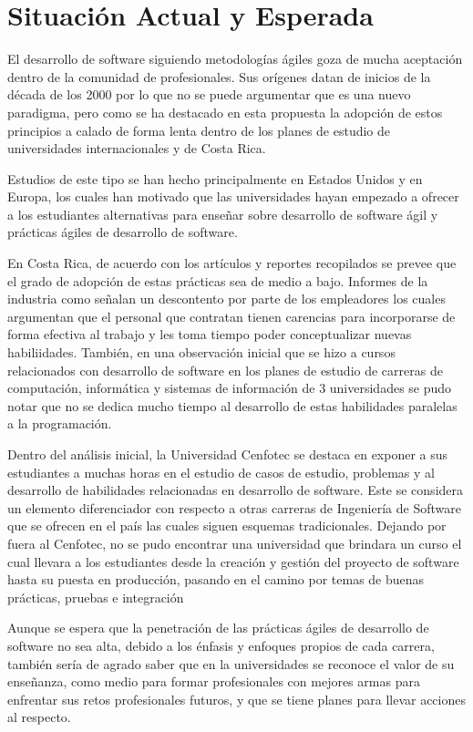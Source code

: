 \section{Situación Actual y Esperada}
El desarrollo de software siguiendo metodologías ágiles goza de mucha aceptación dentro de la comunidad de profesionales. Sus orígenes datan de inicios de la década de los 2000 por lo que no se puede argumentar que es una nuevo paradigma, pero como se ha destacado en esta propuesta la adopción  de estos principios a calado de forma lenta dentro de los planes de estudio de universidades internacionales y de Costa Rica.

Estudios de este tipo se han hecho principalmente en Estados Unidos y en Europa, los cuales han motivado que las universidades hayan empezado a ofrecer a los estudiantes alternativas para enseñar sobre desarrollo de software ágil y prácticas ágiles de desarrollo de software.

En Costa Rica, de acuerdo con los artículos y reportes recopilados se prevee que el grado de adopción de estas prácticas sea de medio a bajo. Informes de la industria como \cite{prosic, murillo-trejos} señalan un descontento por parte de los empleadores los cuales argumentan que el personal que contratan tienen carencias para incorporarse de forma efectiva al trabajo y les toma tiempo poder conceptualizar nuevas habiliidades. También, en una observación inicial que se hizo a cursos relacionados con desarrollo de software en los planes de estudio de carreras de computación, informática y sistemas de información de 3 universidades se pudo notar que no se dedica mucho tiempo al desarrollo de estas habilidades paralelas a la programación.

Dentro del análisis inicial, la Universidad Cenfotec se destaca en exponer a sus estudiantes a muchas horas en el estudio de casos de estudio, problemas y al desarrollo de habilidades relacionadas en desarrollo de software. Este se considera un elemento diferenciador con respecto a otras carreras de Ingeniería de Software que se ofrecen en el país las cuales siguen esquemas tradicionales. Dejando por fuera al Cenfotec, no se pudo encontrar una universidad que brindara un curso el cual llevara a los estudiantes desde la creación y gestión del proyecto de software hasta su puesta en producción, pasando en el camino por temas de buenas prácticas, pruebas e integración

Aunque se espera que la penetración de las prácticas ágiles de desarrollo de software no sea alta, debido a los énfasis y enfoques propios de cada carrera, también sería de agrado saber que en la universidades se reconoce el valor de su enseñanza, como medio para formar profesionales con mejores armas para enfrentar sus retos profesionales futuros, y que se tiene planes para llevar acciones al respecto.


